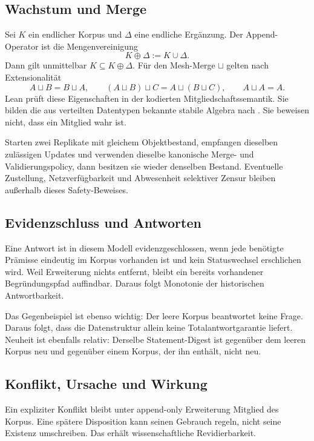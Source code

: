 \documentclass[11pt,a4paper,oneside]{article}
\begin{document}
\subsection{Wachstum und Merge}

Sei $K$ ein endlicher Korpus und $\Delta$ eine endliche Ergänzung. Der
Append-Operator ist die Mengenvereinigung
\[
  K \oplus \Delta := K \cup \Delta.
\]
Dann gilt unmittelbar $K\subseteq K\oplus\Delta$. Für den Mesh-Merge $\sqcup$
gelten nach Extensionalität
\[
 A\sqcup B = B\sqcup A,\qquad
 (A\sqcup B)\sqcup C=A\sqcup(B\sqcup C),\qquad
 A\sqcup A=A.
\]
Lean prüft diese Eigenschaften in der kodierten Mitgliedschaftssemantik.
Sie bilden die aus verteilten Datentypen bekannte stabile Algebra nach
\cite{Shapiro2011}. Sie beweisen nicht, dass ein Mitglied wahr ist.

\begin{resultbox}
Starten zwei Replikate mit gleichem Objektbestand, empfangen dieselben
zulässigen Updates und verwenden dieselbe kanonische Merge- und
Validierungspolicy, dann besitzen sie wieder denselben Bestand. Eventuelle
Zustellung, Netzverfügbarkeit und Abwesenheit selektiver Zensur bleiben
außerhalb dieses Safety-Beweises.
\end{resultbox}

\subsection{Evidenzschluss und Antworten}

Eine Antwort ist in diesem Modell evidenzgeschlossen, wenn jede benötigte
Prämisse eindeutig im Korpus vorhanden ist und kein Statuswechsel erschlichen
wird. Weil Erweiterung nichts entfernt, bleibt ein bereits vorhandener
Begründungspfad auffindbar. Daraus folgt Monotonie der historischen
Antwortbarkeit.

Das Gegenbeispiel ist ebenso wichtig: Der leere Korpus beantwortet keine
Frage. Daraus folgt, dass die Datenstruktur allein keine Totalantwortgarantie
liefert. Neuheit ist ebenfalls relativ: Derselbe Statement-Digest ist gegenüber
dem leeren Korpus neu und gegenüber einem Korpus, der ihn enthält, nicht neu.

\subsection{Konflikt, Ursache und Wirkung}

Ein expliziter Konflikt bleibt unter append-only Erweiterung Mitglied des
Korpus. Eine spätere Disposition kann seinen Gebrauch regeln, nicht seine
Existenz umschreiben. Das erhält wissenschaftliche Revidierbarkeit.
\end{document}
